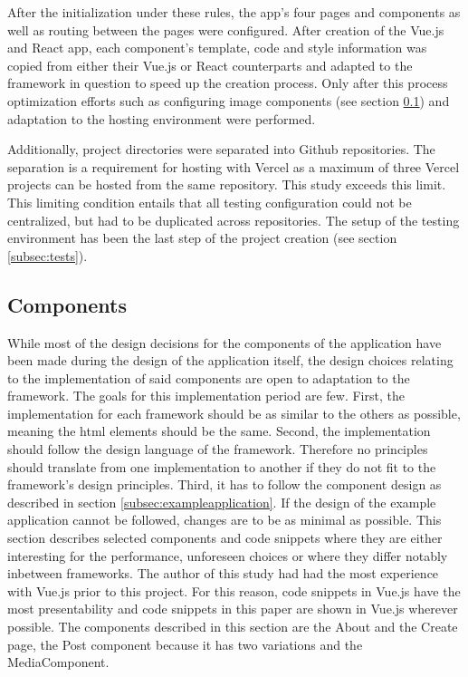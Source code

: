 \documentclass[a4paper, 10pt]{article}
\begin{document}
After the initialization under these rules, the app's four pages and components as well as routing between the pages were configured.
After creation of the Vue.js and React app, each component's template, code and style information was copied from either their Vue.js or React counterparts and adapted to the framework in question to speed up the creation process.
Only after this process optimization efforts such as configuring image components (see section \ref{subsec:components}) and adaptation to the hosting environment were performed.

Additionally, project directories were separated into Github repositories.
The separation is a requirement for hosting with Vercel as a maximum of three Vercel projects can be hosted from the same repository.
This study exceeds this limit.
This limiting condition entails that all testing configuration could not be centralized, but had to be duplicated across repositories.
The setup of the testing environment has been the last step of the project creation (see section \ref{subsec:tests}).

\subsection{Components}\label{subsec:components}
% 

While most of the design decisions for the components of the application have been made during the design of the application itself, the design choices relating to the implementation of said components are open to adaptation to the framework.
The goals for this implementation period are few.
First, the implementation for each framework should be as similar to the others as possible, meaning the \acrshort{html} elements should be the same.
Second, the implementation should follow the design language of the framework.
Therefore no principles should translate from one implementation to another if they do not fit to the framework's design principles.
Third, it has to follow the component design as described in section \ref{subsec:exampleapplication}.
If the design of the example application cannot be followed, changes are to be as minimal as possible.
This section describes selected components and code snippets where they are either interesting for the performance, unforeseen choices or where they differ notably inbetween frameworks.
The author of this study had had the most experience with Vue.js prior to this project.
For this reason, code snippets in Vue.js have the most presentability and code snippets in this paper are shown in Vue.js wherever possible.
The components described in this section are the About and the Create page, the Post component because it has two variations and the MediaComponent.
\end{document}
